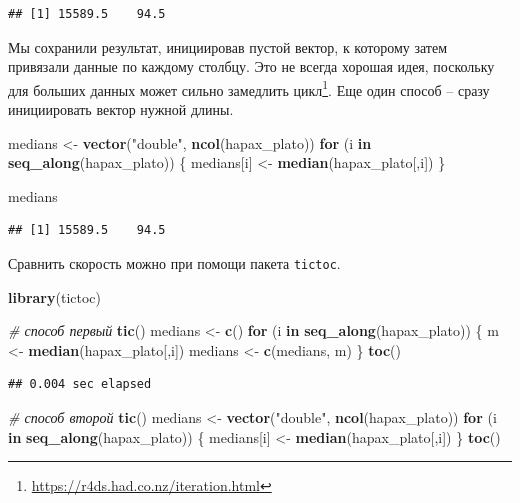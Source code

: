 \documentclass[
]{book}
\newenvironment{Shaded}{\begin{snugshade}}{\end{snugshade}}
\newcommand{\CommentTok}[1]{\textcolor[rgb]{0.56,0.35,0.01}{\textit{#1}}}
\newcommand{\ControlFlowTok}[1]{\textcolor[rgb]{0.13,0.29,0.53}{\textbf{#1}}}
\newcommand{\FunctionTok}[1]{\textcolor[rgb]{0.13,0.29,0.53}{\textbf{#1}}}
\newcommand{\NormalTok}[1]{#1}
\newcommand{\OtherTok}[1]{\textcolor[rgb]{0.56,0.35,0.01}{#1}}
\newcommand{\StringTok}[1]{\textcolor[rgb]{0.31,0.60,0.02}{#1}}
\theoremstyle{definition}
\theoremstyle{definition}
\theoremstyle{definition}
\theoremstyle{definition}
\theoremstyle{remark}
\begin{document}
\begin{verbatim}
## [1] 15589.5    94.5
\end{verbatim}

Мы сохранили результат, инициировав пустой вектор, к которому затем привязали данные по каждому столбцу. Это не всегда хорошая идея, поскольку для больших данных может сильно замедлить цикл\footnote{\url{https://r4ds.had.co.nz/iteration.html}}. Еще один способ -- сразу инициировать вектор нужной длины.

\begin{Shaded}
\begin{Highlighting}[]
\NormalTok{medians }\OtherTok{\textless{}{-}} \FunctionTok{vector}\NormalTok{(}\StringTok{"double"}\NormalTok{, }\FunctionTok{ncol}\NormalTok{(hapax\_plato))}
\ControlFlowTok{for}\NormalTok{ (i }\ControlFlowTok{in} \FunctionTok{seq\_along}\NormalTok{(hapax\_plato)) \{ }
\NormalTok{  medians[i] }\OtherTok{\textless{}{-}} \FunctionTok{median}\NormalTok{(hapax\_plato[,i])}
\NormalTok{\}}

\NormalTok{medians}
\end{Highlighting}
\end{Shaded}

\begin{verbatim}
## [1] 15589.5    94.5
\end{verbatim}

Сравнить скорость можно при помощи пакета \texttt{tictoc}.

\begin{Shaded}
\begin{Highlighting}[]
\FunctionTok{library}\NormalTok{(tictoc)}

\CommentTok{\# способ первый }
\FunctionTok{tic}\NormalTok{()}
\NormalTok{medians }\OtherTok{\textless{}{-}} \FunctionTok{c}\NormalTok{()}
\ControlFlowTok{for}\NormalTok{ (i }\ControlFlowTok{in} \FunctionTok{seq\_along}\NormalTok{(hapax\_plato)) \{ }
\NormalTok{  m }\OtherTok{\textless{}{-}} \FunctionTok{median}\NormalTok{(hapax\_plato[,i])}
\NormalTok{  medians }\OtherTok{\textless{}{-}} \FunctionTok{c}\NormalTok{(medians, m)}
\NormalTok{\}}
\FunctionTok{toc}\NormalTok{()}
\end{Highlighting}
\end{Shaded}

\begin{verbatim}
## 0.004 sec elapsed
\end{verbatim}

\begin{Shaded}
\begin{Highlighting}[]
\CommentTok{\# способ второй}
\FunctionTok{tic}\NormalTok{()}
\NormalTok{medians }\OtherTok{\textless{}{-}} \FunctionTok{vector}\NormalTok{(}\StringTok{"double"}\NormalTok{, }\FunctionTok{ncol}\NormalTok{(hapax\_plato))}
\ControlFlowTok{for}\NormalTok{ (i }\ControlFlowTok{in} \FunctionTok{seq\_along}\NormalTok{(hapax\_plato)) \{ }
\NormalTok{  medians[i] }\OtherTok{\textless{}{-}} \FunctionTok{median}\NormalTok{(hapax\_plato[,i])}
\NormalTok{\}}
\FunctionTok{toc}\NormalTok{()}
\end{Highlighting}
\end{Shaded}
\end{document}
